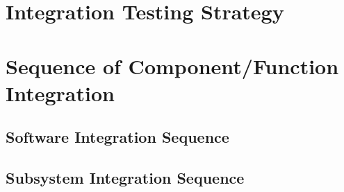 \section{Integration Testing Strategy}
\section{Sequence of Component/Function Integration}
\subsection{Software Integration Sequence}
\subsection{Subsystem Integration Sequence}
